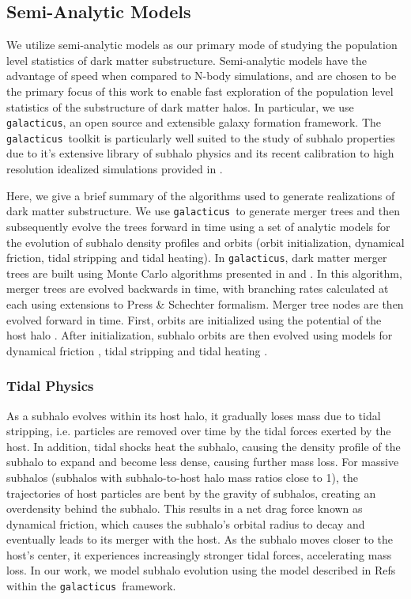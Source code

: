 \documentclass[%
 reprint,
 amsmath,
 amssymb,
 aps,
prd,
twocolumn,
superscriptaddress,
preprintnumbers,
floatfix,
nofootinbib
]{revtex4-2}
\def\gal{{\tt galacticus}~}
\def\galns{{\tt galacticus}}
\begin{document}
\subsection{Semi-Analytic Models}\label{sec_methods_models}
We utilize semi-analytic models as our primary mode of studying the population level statistics of dark matter substructure.
Semi-analytic models have the advantage of speed when compared to N-body simulations, and are chosen to be the primary focus of this work to enable fast exploration of the population level statistics of the substructure of dark matter halos.
In particular, we use \galns, an open source and extensible galaxy formation framework.
The \gal toolkit is particularly well suited to the study of subhalo properties due to it's extensive library of subhalo physics and its recent calibration to high resolution idealized simulations provided in \citet{2024arXiv240309597D}.

Here, we give a brief summary of the algorithms used to generate realizations of dark matter substructure.
We use \gal to generate merger trees and then subsequently evolve the trees forward in time using a set of analytic models for the evolution of subhalo density profiles and orbits (orbit initialization, dynamical friction, tidal stripping and tidal heating).
In \galns, dark matter merger trees are built using Monte Carlo algorithms presented in \citet{10.1046/j.1365-8711.2000.03879.x} and \citet{parkinson2008generating}.
In this algorithm, merger trees are evolved backwards in time, with branching rates calculated at each using extensions \citep{bond1991excursion, bower1991evolution}
to Press \& Schechter \citep{press1974formation} formalism.
Merger tree nodes are then evolved forward in time.
First, orbits are initialized using the potential of the host halo \citep{jiang2015orbital}.
After initialization, subhalo orbits are then evolved using models for dynamical friction \citep{chandrasekhar1943dynamical}, tidal stripping \citep{zentner2005physics} and tidal heating \citep{gnedin1999tidal}.


\subsubsection{Tidal Physics}
    As a subhalo evolves within its host halo, it gradually loses mass due to tidal stripping, i.e. particles are removed over time by the tidal forces exerted by the host.
    In addition, tidal shocks heat the subhalo, causing the density profile of the subhalo to expand and become less dense, causing further mass loss.
    For massive subhalos (subhalos with subhalo-to-host halo mass ratios close to 1), the trajectories of host particles are bent by the gravity of subhalos, creating an overdensity behind the subhalo.
    This results in a net drag force known as dynamical friction, which causes the subhalo's orbital radius to decay and eventually leads to its merger with the host.
    As the subhalo moves closer to the host's center, it experiences increasingly stronger tidal forces, accelerating mass loss. 
    In our work, we model subhalo evolution using the model described in Refs \citep{10.1093/mnras/staa2496, 2022MNRAS.517.1398B, 2024arXiv240309597D} within the \gal framework. 
\end{document}
